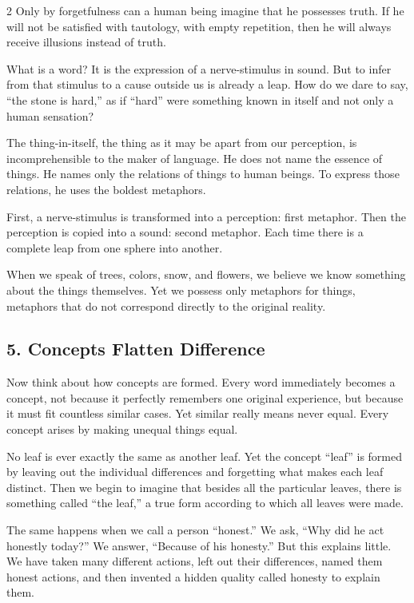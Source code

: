 \documentclass[12pt]{article}
\begin{document}
\begin{multicols}{2}
Only by forgetfulness can a human being imagine that he possesses truth. If he will not be satisfied with tautology, with empty repetition, then he will always receive illusions instead of truth.

What is a word? It is the expression of a nerve-stimulus in sound. But to infer from that stimulus to a cause outside us is already a leap. How do we dare to say, ``the stone is hard,'' as if ``hard'' were something known in itself and not only a human sensation?

The thing-in-itself, the thing as it may be apart from our perception, is incomprehensible to the maker of language. He does not name the essence of things. He names only the relations of things to human beings. To express those relations, he uses the boldest metaphors.

First, a nerve-stimulus is transformed into a perception: first metaphor. Then the perception is copied into a sound: second metaphor. Each time there is a complete leap from one sphere into another.

When we speak of trees, colors, snow, and flowers, we believe we know something about the things themselves. Yet we possess only metaphors for things, metaphors that do not correspond directly to the original reality.

\subsection*{5. Concepts Flatten Difference}
Now think about how concepts are formed. Every word immediately becomes a concept, not because it perfectly remembers one original experience, but because it must fit countless similar cases. Yet similar really means never equal. Every concept arises by making unequal things equal.

No leaf is ever exactly the same as another leaf. Yet the concept ``leaf'' is formed by leaving out the individual differences and forgetting what makes each leaf distinct. Then we begin to imagine that besides all the particular leaves, there is something called ``the leaf,'' a true form according to which all leaves were made.

The same happens when we call a person ``honest.'' We ask, ``Why did he act honestly today?'' We answer, ``Because of his honesty.'' But this explains little. We have taken many different actions, left out their differences, named them honest actions, and then invented a hidden quality called honesty to explain them.


\end{multicols}
\end{document}
